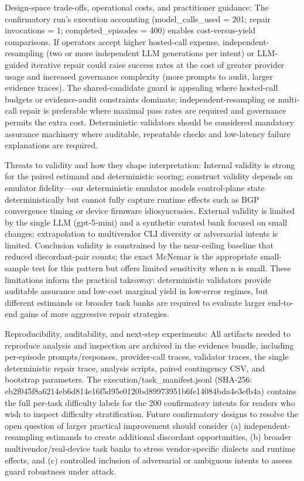\documentclass[conference]{IEEEtran}
\begin{document}
Design-space trade-offs, operational costs, and practitioner guidance: The confirmatory run's execution accounting (model\_calls\_used = 201; repair invocations = 1; completed\_episodes = 400) enables cost-versus-yield comparisons. If operators accept higher hosted-call expense, independent-resampling (two or more independent LLM generations per intent) or LLM-guided iterative repair could raise success rates at the cost of greater provider usage and increased governance complexity (more prompts to audit, larger evidence traces). The shared-candidate guard is appealing where hosted-call budgets or evidence-audit constraints dominate; independent-resampling or multi-call repair is preferable where maximal pass rates are required and governance permits the extra cost. Deterministic validators should be considered mandatory assurance machinery where auditable, repeatable checks and low-latency failure explanations are required.

Threats to validity and how they shape interpretation: Internal validity is strong for the paired estimand and deterministic scoring; construct validity depends on emulator fidelity---our deterministic emulator models control-plane state deterministically but cannot fully capture runtime effects such as BGP convergence timing or device firmware idiosyncrasies. External validity is limited by the single LLM (gpt-5-mini) and a synthetic curated bank focused on small changes; extrapolation to multivendor CLI diversity or adversarial intents is limited. Conclusion validity is constrained by the near-ceiling baseline that reduced discordant-pair counts; the exact McNemar is the appropriate small-sample test for this pattern but offers limited sensitivity when n is small. These limitations inform the practical takeaway: deterministic validators provide auditable assurance and low-cost marginal yield in low-error regimes, but different estimands or broader task banks are required to evaluate larger end-to-end gains of more aggressive repair strategies.

Reproducibility, auditability, and next-step experiments: All artifacts needed to reproduce analysis and inspection are archived in the evidence bundle, including per-episode prompts/responses, provider-call traces, validator traces, the single deterministic repair trace, analysis scripts, paired contingency CSV, and bootstrap parameters. The execution/task\_manifest.jsonl (SHA-256: eb2f045f\allowbreak{}8a6214eb\allowbreak{}6d814e16\allowbreak{}f5d95e01\allowbreak{}20bd8997\allowbreak{}3951b6fe\allowbreak{}14084bda\allowbreak{}4e3efb4a) contains the full per-task difficulty labels for the 200 confirmatory intents for readers who wish to inspect difficulty stratification. Future confirmatory designs to resolve the open question of larger practical improvement should consider (a) independent-resampling estimands to create additional discordant opportunities, (b) broader multivendor/real-device task banks to stress vendor-specific dialects and runtime effects, and (c) controlled inclusion of adversarial or ambiguous intents to assess guard robustness under attack.
\end{document}
